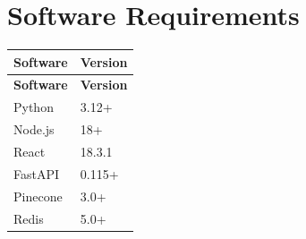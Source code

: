 \documentclass[12pt,a4paper]{book}
\numberwithin{table}{chapter}
\numberwithin{figure}{chapter}
\numberwithin{equation}{chapter}
\begin{document}
\section{Software Requirements}

\begin{longtable}{|p{2in}|p{4in}|}
\hline
\textbf{Software} & \textbf{Version}\\
\hline
\endfirsthead
\hline
\textbf{Software} & \textbf{Version}\\
\hline
\endhead
\hline
Python & 3.12+\\
\hline
Node.js & 18+\\
\hline
React & 18.3.1\\
\hline
FastAPI & 0.115+\\
\hline
Pinecone & 3.0+\\
\hline
Redis & 5.0+\\
\hline
\end{longtable}

\end{document}
